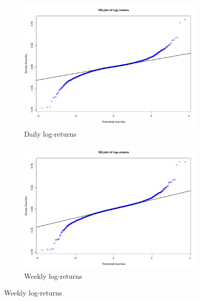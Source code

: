 \begin{figure}[hbtp]
	\centering
	\begin{subfigure}{.5\textwidth}
		\centering
		\includegraphics[scale=.2]{img/finData/QQPlotDailyLogRet}
		\caption{Daily log-returns}
	\end{subfigure}%
	\begin{subfigure}{.5\textwidth}
		\centering
		\includegraphics[scale=.2]{img/finData/QQPlotWeeklyLogRet}
		\caption{Weekly log-returns}
	\end{subfigure}%
	
	\vspace{.4cm}
	

\end{figure}
